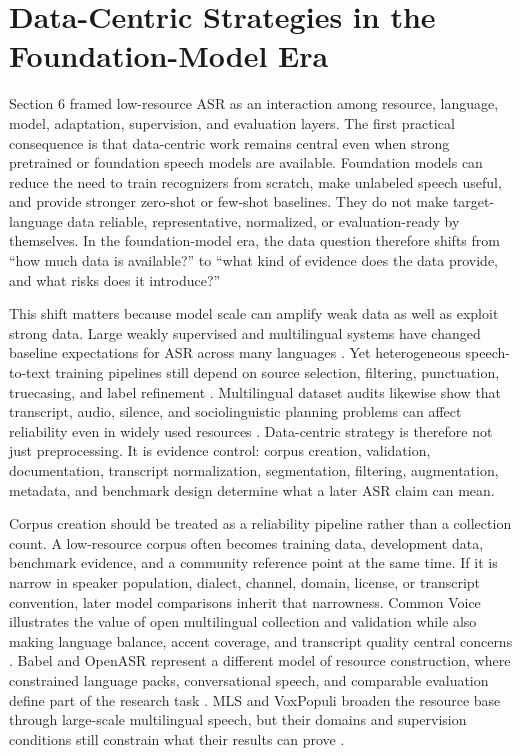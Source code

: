 \documentclass[pdflatex,sn-basic]{sn-jnl}
\theoremstyle{thmstyleone}
\theoremstyle{thmstyletwo}
\theoremstyle{thmstylethree}
\begin{document}
\section{Data-Centric Strategies in the Foundation-Model Era}

Section 6 framed low-resource ASR as an interaction among resource, language, model, adaptation, supervision, and evaluation layers. The first practical consequence is that data-centric work remains central even when strong pretrained or foundation speech models are available. Foundation models can reduce the need to train recognizers from scratch, make unlabeled speech useful, and provide stronger zero-shot or few-shot baselines. They do not make target-language data reliable, representative, normalized, or evaluation-ready by themselves. In the foundation-model era, the data question therefore shifts from ``how much data is available?'' to ``what kind of evidence does the data provide, and what risks does it introduce?''

This shift matters because model scale can amplify weak data as well as exploit strong data. Large weakly supervised and multilingual systems have changed baseline expectations for ASR across many languages \citep{pmlr-v202-radford23a,pratap2024mms}. Yet heterogeneous speech-to-text training pipelines still depend on source selection, filtering, punctuation, truecasing, and label refinement \citep{tian24_interspeech}. Multilingual dataset audits likewise show that transcript, audio, silence, and sociolinguistic planning problems can affect reliability even in widely used resources \citep{lau2025_data_quality_multilingual_speech}. Data-centric strategy is therefore not just preprocessing. It is evidence control: corpus creation, validation, documentation, transcript normalization, segmentation, filtering, augmentation, metadata, and benchmark design determine what a later ASR claim can mean.

Corpus creation should be treated as a reliability pipeline rather than a collection count. A low-resource corpus often becomes training data, development data, benchmark evidence, and a community reference point at the same time. If it is narrow in speaker population, dialect, channel, domain, license, or transcript convention, later model comparisons inherit that narrowness. Common Voice illustrates the value of open multilingual collection and validation while also making language balance, accent coverage, and transcript quality central concerns \citep{ardila2020commonvoice}. Babel and OpenASR represent a different model of resource construction, where constrained language packs, conversational speech, and comparable evaluation define part of the research task \citep{gales2014_babel_project_research_cued,peterson2022_openasr21}. MLS and VoxPopuli broaden the resource base through large-scale multilingual speech, but their domains and supervision conditions still constrain what their results can prove \citep{pratap20_interspeech,wang2021voxpopuli}.
\end{document}
